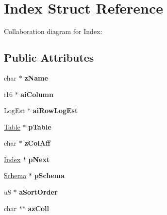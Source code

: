 \hypertarget{struct_index}{\section{Index Struct Reference}
\label{struct_index}
}


Collaboration diagram for Index\+:
\subsection*{Public Attributes}
\begin{DoxyCompactItemize}
\item 
\hypertarget{struct_index_a8848cddf6e09f22e3b794ec019082ced}{char $\ast$ {\bfseries z\+Name}}\label{struct_index_a8848cddf6e09f22e3b794ec019082ced}

\item 
\hypertarget{struct_index_a62b5bf88f7c567f15e9a8c9da579d45c}{i16 $\ast$ {\bfseries ai\+Column}}\label{struct_index_a62b5bf88f7c567f15e9a8c9da579d45c}

\item 
\hypertarget{struct_index_a830ea536e93022501262afe908bdd35c}{Log\+Est $\ast$ {\bfseries ai\+Row\+Log\+Est}}\label{struct_index_a830ea536e93022501262afe908bdd35c}

\item 
\hypertarget{struct_index_a01c6d4da27cba325ca58f333f87a6f44}{\hyperlink{struct_table}{Table} $\ast$ {\bfseries p\+Table}}\label{struct_index_a01c6d4da27cba325ca58f333f87a6f44}

\item 
\hypertarget{struct_index_af076df9f74dd836001c0a59d27274c0e}{char $\ast$ {\bfseries z\+Col\+Aff}}\label{struct_index_af076df9f74dd836001c0a59d27274c0e}

\item 
\hypertarget{struct_index_a115a17d236bd277d59dd5ea030954c3e}{\hyperlink{struct_index}{Index} $\ast$ {\bfseries p\+Next}}\label{struct_index_a115a17d236bd277d59dd5ea030954c3e}

\item 
\hypertarget{struct_index_af14f5ddd57eab2aba63dcb5db2aa92af}{\hyperlink{struct_schema}{Schema} $\ast$ {\bfseries p\+Schema}}\label{struct_index_af14f5ddd57eab2aba63dcb5db2aa92af}

\item 
\hypertarget{struct_index_a0a3fc87b53193995f59c9657443e9a99}{u8 $\ast$ {\bfseries a\+Sort\+Order}}\label{struct_index_a0a3fc87b53193995f59c9657443e9a99}

\item 
\hypertarget{struct_index_ab690ebb96c0329896b0fe2ab56813b88}{char $\ast$$\ast$ {\bfseries az\+Coll}}\label{struct_index_ab690ebb96c0329896b0fe2ab56813b88}


\end{DoxyCompactItemize}

